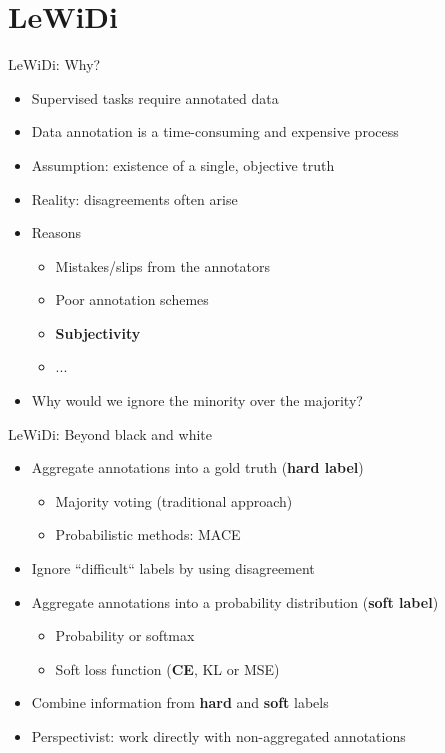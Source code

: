 \section{LeWiDi}
\begin{frame}{LeWiDi: Why?}
\begin{itemize}
    \item Supervised tasks require annotated data
    \item Data annotation is a time-consuming and expensive process
    \item Assumption: existence of a single, objective truth
    \item Reality: disagreements often arise
    \item Reasons
    \begin{itemize}
        \item Mistakes/slips from the annotators
        \item Poor annotation schemes
        \item \textbf{Subjectivity}
        \item ...
    \end{itemize}
    \item Why would we ignore the minority over the majority?
\end{itemize}
\end{frame}

\begin{frame}{LeWiDi: Beyond black and white}
\begin{itemize}
    \item Aggregate annotations into a gold truth (\textbf{hard label})
    \begin{itemize}
        \item Majority voting (traditional approach)
        \item Probabilistic methods: MACE 
    \end{itemize}
    \item Ignore ``difficult`` labels by using disagreement
    \item Aggregate annotations into a probability distribution (\textbf{soft label})
    \begin{itemize}
        \item Probability or softmax
        \item Soft loss function (\textbf{CE}, KL or MSE)
    \end{itemize}
    \item Combine information from \textbf{hard} and \textbf{soft} labels
    \item Perspectivist: work directly with non-aggregated annotations
\end{itemize}
 \end{frame}

